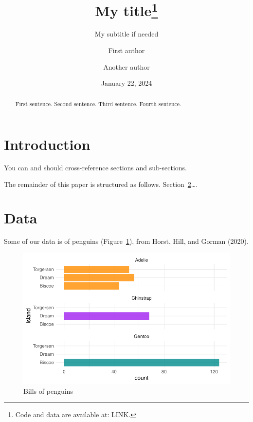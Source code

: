 \documentclass[
  letterpaper,
  DIV=11,
  numbers=noendperiod]{scrartcl}
\title{My title\thanks{Code and data are available at: LINK.}}
\subtitle{My subtitle if needed}
\author{First author \and Another author}
\date{January 22, 2024}
\begin{document}
\maketitle
\begin{abstract}
First sentence. Second sentence. Third sentence. Fourth sentence.
\end{abstract}
\ifdefined\Shaded\renewenvironment{Shaded}{\begin{tcolorbox}[boxrule=0pt, enhanced, breakable, borderline west={3pt}{0pt}{shadecolor}, frame hidden, sharp corners, interior hidden]}{\end{tcolorbox}}\fi

\hypertarget{introduction}{%
\section{Introduction}\label{introduction}}

You can and should cross-reference sections and sub-sections.

The remainder of this paper is structured as follows.
Section~\ref{sec-data}\ldots.

\hypertarget{sec-data}{%
\section{Data}\label{sec-data}}

Some of our data is of penguins (Figure~\ref{fig-bills}), from Horst,
Hill, and Gorman (2020).

\begin{figure}

{\centering \includegraphics{paper_files/figure-pdf/fig-bills-1.pdf}

}

\caption{\label{fig-bills}Bills of penguins}

\end{figure}
\end{document}
